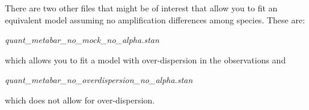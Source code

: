 \documentclass[
]{article}
\begin{document}
There are two other files that might be of interest that allow you to
fit an equivalent model assuming no amplification differences among
species. These are:

\emph{quant\_metabar\_no\_mock\_no\_alpha.stan}

which allows you to fit a model with over-dispersion in the observations
and

\emph{quant\_metabar\_no\_overdispersion\_no\_alpha.stan}

which does not allow for over-dispersion.
\end{document}
